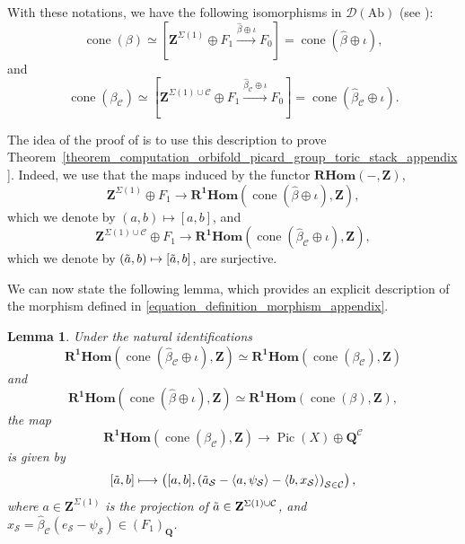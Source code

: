 \documentclass{proc-l}
\newcommand{\Z}{\mathbf{Z}}
\newcommand{\Q}{\mathbf{Q}}
\DeclareMathOperator{\Pic}{Pic}
\DeclareMathOperator{\coneform}{cone}
\newcommand{\stackS}{\mathcal{S}}
\newtheorem{lemma}[theorem]{Lemma}
\theoremstyle{definition}
\theoremstyle{remark}
\numberwithin{equation}{section}
\begin{document}
With these notations, we have the following isomorphisms in $\mathcal{D}(\mathrm{Ab})$ (see \cite[Section 2]{borisov_toric_stack}):
\[
\coneform(\beta) \simeq \left[ \Z^{\Sigma(1)} \oplus F_1 \xrightarrow{\widehat{\beta}\oplus \iota} F_0 \right] = \coneform(\widehat{\beta}\oplus \iota),
\]
and
\[
\coneform(\beta_{\mathcal{C}}) \simeq \left[ \Z^{\Sigma(1)\cup\mathcal{C}} \oplus F_1 \xrightarrow{\widehat{\beta}_\mathcal{C}\oplus \iota} F_0 \right] = \coneform(\widehat{\beta}_\mathcal{C}\oplus \iota).
\]

The idea of the proof of \cite[Proposition 21]{Coates_Corti_Iritani_Tseng_miror_theorem_toric_stack} is to use this description to prove Theorem~\ref{theorem_computation_orbifold_picard_group_toric_stack_appendix}. Indeed, we use that the maps induced by the functor $\mathbf{RHom}(-,\Z)$,
\[
\Z^{\Sigma(1)} \oplus F_1 \rightarrow \mathbf{R^1Hom}(\coneform(\widehat{\beta}\oplus \iota),\Z),
\]
which we denote by $(a,b) \mapsto [a,b]$, and
\[
\Z^{\Sigma(1)\cup\mathcal{C}} \oplus F_1 \rightarrow \mathbf{R^1 Hom}(\coneform(\widehat{\beta}_\mathcal{C}\oplus \iota),\Z),
\]
which we denote by $(\Tilde{a},b) \mapsto [\Tilde{a},b]$, are surjective.

We can now state the following lemma, which provides an explicit description of the morphism defined in \eqref{equation_definition_morphism_appendix}.

\begin{lemma}\label{lemma_appendix_a_description_map_isomorphism}
Under the natural identifications
\[
\mathbf{R^1 Hom}(\coneform(\widehat{\beta}_\mathcal{C}\oplus \iota),\Z) \simeq \mathbf{R^1 Hom}(\coneform(\beta_{\mathcal{C}}),\Z)
\]
and
\[
\mathbf{R^1 Hom}(\coneform(\widehat{\beta}\oplus \iota),\Z) \simeq \mathbf{R^1 Hom}(\coneform(\beta),\Z),
\]
the map
\[
\mathbf{R^1 Hom}(\coneform(\beta_{\mathcal{C}}),\Z) \longrightarrow \Pic(X) \oplus \Q^{\mathcal{C}}
\]
is given by
\[
[\Tilde{a},b] \longmapsto \left( [a,b] , \left( \Tilde{a}_{\stackS} - \langle a , \psi_{\stackS} \rangle - \langle b , x_{\stackS} \rangle \right)_{\stackS \in \mathcal{C}} \right),
\]
where $a \in \Z^{\Sigma(1)}$ is the projection of $\Tilde{a} \in \Z^{\Sigma(1) \cup \mathcal{C}}$, and $x_{\stackS} = \widehat{\beta}_\mathcal{C}(e_{\stackS} - \psi_{\stackS}) \in (F_{1})_{ \Q}$.
\end{lemma}
\end{document}
